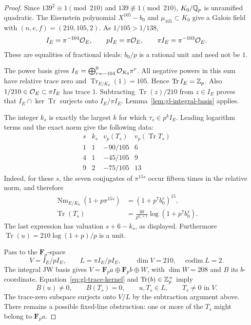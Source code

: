 \begin{proof}
Since $139^2\equiv1\pmod{210}$ and $139\not\equiv1\pmod{210}$,
$K_0/\mathbb Q_p$ is unramified quadratic. The Eisenstein polynomial
$X^{105}-b_0$ and $\mu_{105}\subset K_0$ give a Galois field
with $(n,e,f)=(210,105,2)$. As $1/105>1/138$,
\begin{equation}\label{eq:gl-139-lattice}
 I_E=\pi^{-104}\mathcal O_E,
 \qquad pI_E=\pi\mathcal O_E,
 \qquad \pi I_E=\pi^{-103}\mathcal O_E.
\end{equation}
These are equalities of fractional ideals: $b_0/p$ is a rational
unit and need not be $1$.

The power basis gives
$I_E=\bigoplus_{r=-104}^0\mathcal O_{K_0}\pi^r$.
All negative powers in this sum have relative trace zero and
$\operatorname{Tr}_{E/K_0}(1)=105$. Hence
$\operatorname{Tr}I_E=\mathbb Z_p$. Also $1/210\in\mathcal O_E\subset\pi I_E$
has trace $1$. Subtracting $\operatorname{Tr}(z)/210$ from
$z\in I_E$ proves that $I_E\cap\ker\operatorname{Tr}$ surjects
onto $I_E/\pi I_E$. Lemma~\ref{lem:gl-integral-basis} applies.

The integer $k_s$ is exactly the largest $k$ for which
$\tau_s\in p^k I_E$. Leading logarithm terms and the exact norm
give the following data:
\[
 \begin{array}{c|ccc}
 s&k_s&v_p(T_s)&v_p(\operatorname{Tr}T_s)\\ \hline
 1&1&-90/105&6\\
 4&1&-45/105&9\\
 9&2&-75/105&13
 \end{array}
\]
Indeed, for these $s$, the seven conjugates of $\pi^{15s}$ occur
fifteen times in the relative norm, and therefore
\begin{equation}\label{eq:gl-139-trace}
 \begin{aligned}
 \operatorname{Nm}_{E/K_0}(1+p\pi^{15s})&=(1+p^7b_0^s)^{15},\\
 \operatorname{Tr}(T_s)
     &=\frac{30}{p^{k_s+1}}\log(1+p^7b_0^s).
 \end{aligned}
\end{equation}
The last expression has valuation $s+6-k_s$, as displayed.
Furthermore $\operatorname{Tr}(u)=210\log(1+p)/p$ is a unit.

Pass to the $\mathbf F_p$-space
\[
 V=I_E/pI_E,
 \qquad L=\pi I_E/pI_E,
 \qquad \dim V=210,\quad\operatorname{codim}L=2.
\]
The integral JW basis gives $V=\mathbf F_pa\oplus\mathbf F_pb
\oplus W$, with $\dim W=208$ and $B$ its $b$-coordinate.
Equation~\eqref{eq:gl-trace-kernel} and
$\operatorname{Tr}(b)\in\mathbb Z_p^\times$ imply
\[
 B(u)\ne0,\qquad B(T_s)=0,
 \qquad u,T_s\in L,
 \qquad T_s\ne0\text{ in }V.
\]
The trace-zero subspace surjects onto $V/L$ by the subtraction
argument above. There remains a possible fixed-line obstruction:
one or more of the $T_s$ might belong to $\mathbf F_pa$.


\end{proof}
